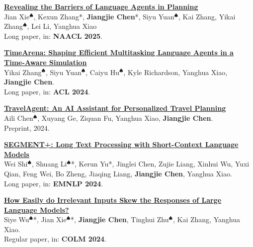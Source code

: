 \documentclass{resume}
\begin{document}
\begin{enumerate}[label={[\arabic*]}]
  \item \textbf{\href{https://jiangjiechen.github.io/publication/barrierinplanning}{Revealing the Barriers of Language Agents in Planning}}\\
  \label{paper:planningbarriers}
  Jian Xie$^\spadesuit$, Kexun Zhang*, \textbf{Jiangjie Chen}*, Siyu Yuan$^\spadesuit$, Kai Zhang, Yikai Zhang$^\spadesuit$, Lei Li, Yanghua Xiao\\
  Long paper, in: \textbf{NAACL 2025}.

  \item \textbf{\href{https://jiangjiechen.github.io/publication/timearena}{TimeArena: Shaping Efficient Multitasking Language Agents in a Time-Aware Simulation}}\\
  \label{paper:timearena}
  Yikai Zhang$^\spadesuit$, Siyu Yuan$^\spadesuit$, Caiyu Hu$^\spadesuit$, Kyle Richardson, Yanghua Xiao, \textbf{Jiangjie Chen}.\\
  Long paper, in: \textbf{ACL 2024}.
  
  \item \textbf{\href{https://jiangjiechen.github.io/publication/travelagent}{TravelAgent: An AI Assistant for Personalized Travel Planning}}\\
  \label{paper:travelagent}
  Aili Chen$^\spadesuit$, Xuyang Ge, Ziquan Fu, Yanghua Xiao, \textbf{Jiangjie Chen}.\\
  Preprint, 2024.
  
  \item \textbf{\href{https://jiangjiechen.github.io/publication/segmentplus}{SEGMENT+: Long Text Processing with Short-Context Language Models}}\\
  \label{paper:segmentplus}
  Wei Shi$^\spadesuit$, Shuang Li$^\spadesuit$*, Kerun Yu*, Jinglei Chen, Zujie Liang, Xinhui Wu, Yuxi Qian, Feng Wei, Bo Zheng, Jiaqing Liang, \textbf{Jiangjie Chen}, Yanghua Xiao.\\
  Long paper, in: \textbf{EMNLP 2024}.

  \item \textbf{\href{https://jiangjiechen.github.io/publications/irrelevant}{How Easily do Irrelevant Inputs Skew the Responses of Large Language Models?}}\\
  \label{paper:irrelevant}
  Siye Wu$^\spadesuit$*, Jian Xie$^\spadesuit$*, \textbf{Jiangjie Chen}, Tinghui Zhu$^\spadesuit$, Kai Zhang, Yanghua Xiao.\\
  Regular paper, in: \textbf{COLM 2024}.
  
 


\end{enumerate}
\end{document}
